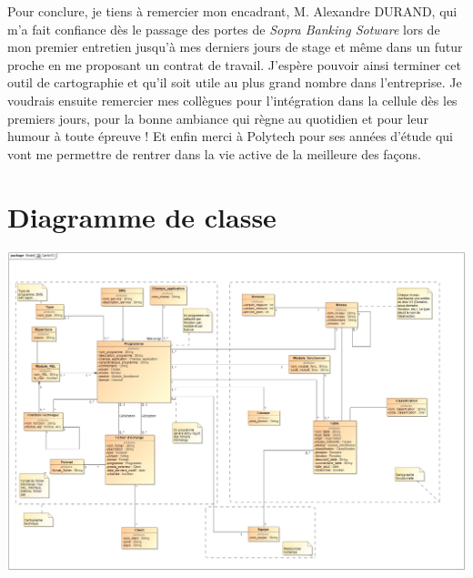 \documentclass{polytech/polytech}
\begin{document}
Pour conclure, je tiens à remercier mon encadrant, M. Alexandre DURAND, qui m'a fait confiance dès le passage des portes de \textit{Sopra Banking Sotware} lors de mon premier entretien jusqu'à mes derniers jours de stage et même dans un futur proche en me proposant un contrat de travail. J'espère pouvoir ainsi terminer cet outil de cartographie et qu'il soit utile au plus grand nombre dans l'entreprise. Je voudrais ensuite remercier mes collègues pour l'intégration dans la cellule dès les premiers jours, pour la bonne ambiance qui règne au quotidien et pour leur humour à toute épreuve ! Et enfin merci à Polytech pour ses années d'étude qui vont me permettre de rentrer dans la vie active de la meilleure des façons.

\appendix

\chapter{Diagramme de classe}
\label{ann:diagClasse}

\begin{landscape}
	\includegraphics[scale=0.37]{images/CartoV3}
\end{landscape}
\end{document}
